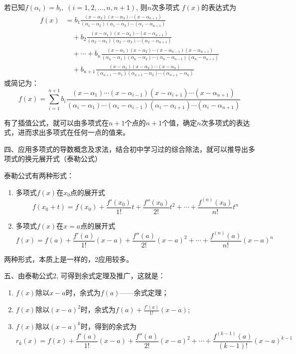 若已知$f(\alpha_i)=b_i,\; (i=1,2,\ldots,n,n+1)$, 则$n$次多项式
$f(x)$的表达式为
\[\begin{split}
f(x)&=b_1\frac{(x-\alpha_2)(x-\alpha_{3})\cdots (x-\alpha_{n+1})}{(\alpha_1-\alpha_2)(\alpha_1-\alpha_3)\cdots (\alpha_1-\alpha_{n+1})}\\
&\quad +b_2\frac{(x-\alpha_1)(x-\alpha_{3})\cdots (x-\alpha_{n+1})}{(\alpha_2-\alpha_1)(\alpha_2-\alpha_3)\cdots (\alpha_2-\alpha_{n+1})}\\
&\quad +\cdots +b_n\frac{(x-\alpha_1)(x-\alpha_{2})\cdots (x-\alpha_{n-1})(x-\alpha_{n+1})}{(\alpha_n-\alpha_1)(\alpha_n-\alpha_2)\cdots (\alpha_n-\alpha_{n-1})(\alpha_n-\alpha_{n+1})}\\
&\quad +b_{n+1}\frac{(x-\alpha_1)(x-\alpha_{2})\cdots (x-\alpha_{n})}{(\alpha_{n+1}-\alpha_1)(\alpha_{n+1}-\alpha_2)\cdots (\alpha_{n+1}-\alpha_{n})}
\end{split}\]
或简记为：
\[f(x)=\sum^{n+1}_{i=1} b_i\frac{(x-\alpha_1)\cdots(x-\alpha_{i-1}) (x-\alpha_{i+1})\cdots(x-\alpha_{n+1})}{(\alpha_i-\alpha_1)\cdots(\alpha_i-\alpha_{i-1}) (\alpha_i-\alpha_{i+1})\cdots(\alpha_i-\alpha_{n+1})}\]

有了插值公式，就可以由多项式在$n+1$个点的$n+1$个值，确定$n$次多项式的表达式，进而求出多项式在任何一点的值来。

四、应用多项式的导数概念及求法，结合初中学习过的综合除法，就可以推导出多项式的换元展开式（泰勒公式）

泰勒公式有两种形式：
\begin{enumerate}
    \item 多项式$f(x)$在$x_0$点的展开式
    \[f(x_0+t)=f(x_0)+\frac{f'(x_0)}{1!}t+\frac{f''(x_0)}{2!}t^2+\cdots+\frac{f^{(n)}(x_0)}{n!}t^n\]
    \item 多项式$f(x)$在$x=a$点的展开式
    \[f(x)=f(a)+\frac{f'(a)}{1!}(x-a)+\frac{f''(a)}{2!}(x-a)^2+\cdots+\frac{f^{(n)}(a)}{n!}(x-a)^n\]
\end{enumerate}
两种形式，本质上是一样的，2应用较多。

五、由泰勒公式2, 可得到余式定理及推广，这就是：
\begin{enumerate}
    \item $f(x)$除以$x-a$时，余式为$f(a)$——余式定理；
    \item $f(x)$除以$(x-a)^2$时，余式为$f(a)+\frac{f'(a)}{1!}(x-a)$;
    \item $f(x)$除以$(x-a)^k$时，得到的余式为
    \[r_k (x) =f (x) +\frac{f'(a)}{1!}(x-a)+\frac{f''(a)}{2!}(x-a)^2+\cdots +\frac{f^{(k-1)}(a)}{(k-1)!}(x-a)^{k-1}\]
\end{enumerate}



